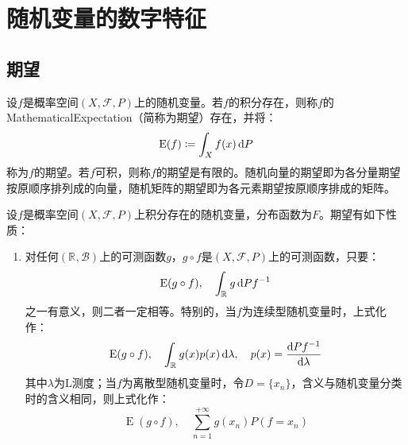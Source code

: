 \section{随机变量的数字特征}

\subsection{期望}
\begin{definition}
	设$f$是概率空间$(X,\mathscr{F},P)$上的随机变量。若$f$的积分存在，则称$f$的\gls{MathematicalExpectation}（简称为期望）存在，并将：
	\begin{equation*}
		\operatorname{E}(f)\coloneq\int_{X}f(x)\mathop{}\!\mathrm{d} P
	\end{equation*}
	称为$f$的期望。若$f$可积，则称$f$的期望是有限的。随机向量的期望即为各分量期望按原顺序排列成的向量，随机矩阵的期望即为各元素期望按原顺序排成的矩阵。
\end{definition}
\begin{property}\label{prop:Expectation}
	设$f$是概率空间$(X,\mathscr{F},P)$上积分存在的随机变量，分布函数为$F$。期望有如下性质：
	\begin{enumerate}
		\item 对任何$(\mathbb{R}^{},\mathcal{B})$上的可测函数$g$，$g\circ f$是$(X,\mathscr{F},P)$上的可测函数，只要：
		\begin{equation*}
			\operatorname{E}(g\circ f),\quad\int_{\mathbb{R}^{}}g\mathop{}\!\mathrm{d} Pf^{-1}
		\end{equation*}
		之一有意义，则二者一定相等。特别的，当$f$为连续型随机变量时，上式化作：
		\begin{equation*}
			\operatorname{E}(g\circ f),\quad\int_{\mathbb{R}^{}}g(x)p(x)\mathop{}\!\mathrm{d}\lambda,\quad p(x)=\frac{\mathop{}\!\mathrm{d} Pf^{-1}}{\mathop{}\!\mathrm{d}\lambda}
		\end{equation*}
		其中$\lambda$为L测度；当$f$为离散型随机变量时，令$D=\{x_n\}$，含义与随机变量分类时的含义相同，则上式化作：
		\begin{equation*}
				\operatorname{E}(g\circ f),\quad\sum_{n=1}^{+\infty}g(x_n)P(f=x_n)
		\end{equation*}
	\end{enumerate}
\end{property}
